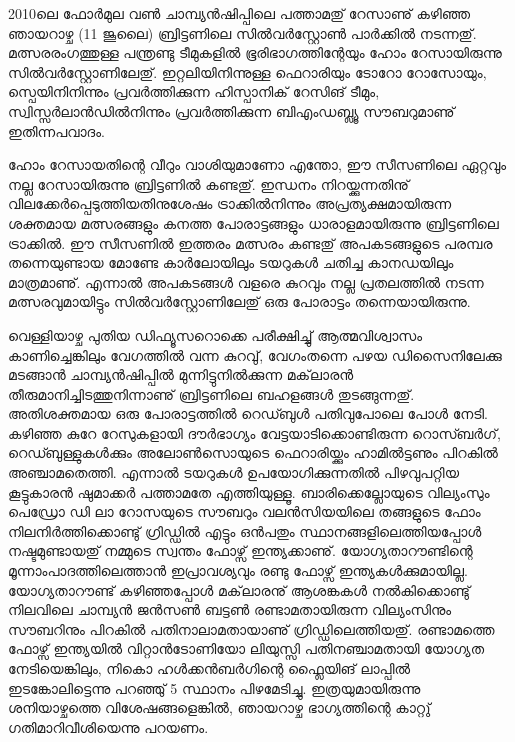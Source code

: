 ﻿
\vskip 2pt
\enlargethispage*{2\baselineskip}

2010ലെ ഫോര്‍മുല വണ്‍ ചാമ്പ്യന്‍ഷിപ്പിലെ പത്താമതു് റേസാണു് കഴിഞ്ഞ ഞായറാഴ്ച (11 ജൂലൈ) ബ്രിട്ടണിലെ സില്‍വര്‍സ്റ്റോണ്‍ പാര്‍ക്കില്‍ 
നടന്നതു്. മത്സരരംഗത്തുള്ള പന്ത്രണ്ടു ടീമുകളില്‍ ഭൂരിഭാഗത്തിന്റേയും ഹോം റേസായിരുന്നു സില്‍വര്‍സ്റ്റോണിലേതു്. ഇറ്റലിയിനിന്നുള്ള ഫെറാരിയും ടോറോ റോസോയും, സ്പെയിനിനിന്നും പ്രവര്‍ത്തിക്കുന്ന ഹിസ്പാനിക് റേസിങ് ടീമും, സ്വിസ്സര്‍ലാന്‍ഡില്‍നിന്നും പ്രവര്‍ത്തിക്കുന്ന ബിഎംഡബ്ല്യൂ സൗബറുമാണു് ഇതിന്നപവാദം.

ഹോം റേസായതിന്റെ വീറും വാശിയുമാണോ എന്തോ, ഈ സീസണിലെ ഏറ്റവും നല്ല റേസായിരുന്നു ബ്രിട്ടണില്‍ കണ്ടതു്.   
ഇന്ധനം നിറയ്ക്കുന്നതിനു് വിലക്കേര്‍പ്പെടുത്തിയതിനുശേഷം ട്രാക്കില്‍നിന്നും അപ്രത്യക്ഷമായിരുന്ന ശക്തമായ മത്സരങ്ങളും കനത്ത
 പോരാട്ടങ്ങളും ധാരാളമായിരുന്നു ബ്രിട്ടണിലെ ട്രാക്കില്‍. ഈ സീസണില്‍ ഇത്തരം മത്സരം കണ്ടതു് അപകടങ്ങളുടെ പരമ്പര 
 തന്നെയുണ്ടായ മോണ്ടേ കാര്‍ലോയിലും ടയറുകള്‍ ചതിച്ച കാനഡയിലും മാത്രമാണു്. എന്നാല്‍ അപകടങ്ങള്‍ വളരെ കുറവും 
 നല്ല പ്രതലത്തില്‍ നടന്ന മത്സരവുമായിട്ടും സില്‍വര്‍സ്റ്റോണിലേതു് ഒരു പോരാട്ടം തന്നെയായിരുന്നു.

വെള്ളിയാഴ്ച പുതിയ ഡിഫ്യൂസറൊക്കെ പരീക്ഷിച്ചു് ആത്മവിശ്വാസം കാണിച്ചെങ്കിലും വേഗത്തില്‍ വന്ന കുറവു്, വേഗംതന്നെ പഴയ 
ഡിസൈനിലേക്കു മടങ്ങാന്‍ ചാമ്പ്യന്‍ഷിപ്പില്‍ മുന്നിട്ടുനില്‍ക്കുന്ന മക്‌ലാരന്‍ തീരുമാനിച്ചിടത്തുനിന്നാണു് ബ്രിട്ടണിലെ ബഹളങ്ങള്‍ 
തുടങ്ങുന്നതു്. അതിശക്തമായ ഒരു പോരാട്ടത്തില്‍ റെഡ്ബുള്‍ പതിവുപോലെ പോള്‍ നേടി. കഴിഞ്ഞ കുറേ റേസുകളായി ദൗര്‍ഭാഗ്യം 
വേട്ടയാടിക്കൊണ്ടിരുന്ന റൊസ്ബര്‍ഗ്, റെഡ്ബുള്ളുകള്‍ക്കും അലോണ്‍സൊയുടെ ഫെറാരിയ്ക്കും ഹാമില്‍ട്ടണും പിറകില്‍ അഞ്ചാമതെത്തി. 
എന്നാല്‍ ടയറുകള്‍ ഉപയോഗിക്കുന്നതില്‍ പിഴവുപറ്റിയ കൂട്ടുകാരന്‍ ഷുമാക്കര്‍ പത്താമതേ എത്തിയുള്ളൂ. ബാരിക്കെല്ലോയുടെ വില്യംസും 
പെഡ്രോ ഡി ലാ റോസയുടെ സൗബറും വലന്‍സിയയിലെ തങ്ങളുടെ ഫോം നിലനിര്‍ത്തിക്കൊണ്ടു് ഗ്രിഡ്ഡില്‍ എട്ടും ഒന്‍പതും 
സ്ഥാനങ്ങളിലെത്തിയപ്പോള്‍ നഷ്ടമുണ്ടായതു് നമ്മുടെ സ്വന്തം ഫോഴ്സ് ഇന്ത്യക്കാണു്. യോഗ്യതാറൗണ്ടിന്റെ മൂന്നാംപാദത്തിലെത്താന്‍ 
ഇപ്രാവശ്യവും രണ്ടു ഫോഴ്സ് ഇന്ത്യകള്‍ക്കുമായില്ല. യോഗ്യതാറൗണ്ട് കഴിഞ്ഞപ്പോള്‍ മക്‌ലാരനു് ആശങ്കകള്‍ നല്‍കിക്കൊണ്ടു് നിലവിലെ 
ചാമ്പ്യന്‍ ജന്‍സണ്‍ ബട്ടണ്‍ രണ്ടാമതായിരുന്ന വില്യംസിനും സൗബറിനും പിറകില്‍ പതിനാലാമതായാണു് ഗ്രിഡ്ഡിലെത്തിയതു്. രണ്ടാമത്തെ 
ഫോഴ്സ് ഇന്ത്യയില്‍ വിറ്റാന്‍ടോണിയോ ലിയുസ്സി പതിനഞ്ചാമതായി യോഗ്യത നേടിയെങ്കിലും, നികൊ ഹള്‍ക്കന്‍ബര്‍ഗിന്റെ ഫ്ലൈയിങ് 
ലാപ്പില്‍ ഇടങ്കോലിട്ടെന്നു പറഞ്ഞു്  5 സ്ഥാനം പിഴമേടിച്ചു. ഇത്രയുമായിരുന്നു ശനിയാഴ്ചത്തെ വിശേഷങ്ങളെങ്കില്‍, ഞായറാഴ്ച ഭാഗ്യത്തിന്റെ 
കാറ്റു് ഗതിമാറിവീശിയെന്നു പറയണം.

